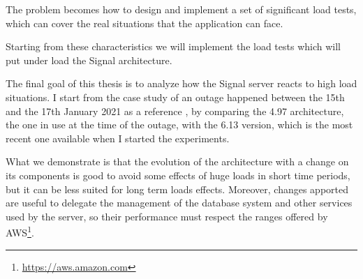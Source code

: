 The problem becomes how to design and implement a set of significant load tests, which can cover the real situations that the application can face.

Starting from these characteristics we will implement the load tests which will put under load the Signal architecture.

The final goal of this thesis is to analyze how the Signal server reacts to high load situations.
I start from the case study of an outage happened between the 15th and the 17th January 2021 as a reference \parencite{woodard_2021,aten_2021}, by comparing the 4.97 architecture, the one in use at the time of the outage, with the 6.13 version, which is the most recent one available when I started the experiments.

What we demonstrate is that the evolution of the architecture with a change on its components is good to avoid some effects of huge loads in short time periods, but it can be less suited for long term loads effects.
Moreover, changes apported are useful to delegate the management of the database system and other services used by the server, so their performance must respect the ranges offered by AWS\footnote{\url{https://aws.amazon.com}}.